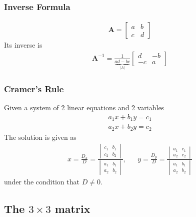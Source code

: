 \documentclass[10pt,a4paper]{book}
\theoremstyle{definition}\newtheorem{definition}{Definition}
\theoremstyle{definition}\newtheorem{fact}{Fact}
\theoremstyle{definition}\newtheorem{ex}{Ex.}
\theoremstyle{definition}\newtheorem{project}{Project}
\theoremstyle{definition}\newtheorem{problem}{Problem}
\theoremstyle{definition}\newtheorem{example}{Example}
\numberwithin{theorem}{chapter}
\numberwithin{corollary}{chapter}
\numberwithin{assumption}{chapter}
\numberwithin{definition}{chapter}
\numberwithin{prop}{chapter}
\numberwithin{notation}{chapter}
\numberwithin{problem}{chapter}
\numberwithin{example}{chapter}
\numberwithin{fact}{chapter}
\numberwithin{ex}{chapter}
\def\A{\mathbf A}
\begin{document}
	\subsubsection{Inverse Formula}
	\begin{align*}
		\A = \begin{bmatrix}
			a & b \\ c & d
		\end{bmatrix}
	\end{align*}
	Its inverse is
	\begin{align*}
		\A^{-1} = \frac{1}
		{\underbrace{ad-bc}_{|A|}} \begin{bmatrix}
			d & -b \\ -c & a
		\end{bmatrix}
	\end{align*}
	\subsubsection{Cramer's Rule}
	Given a system of 2 linear equations and 2 variables
	\begin{align*}
		a_1 x + b_1 y = c_1 \\
		a_2 x + b_2 y = c_2
	\end{align*}
	The solution is given as
	\begin{align*}
		x = \frac{D_x}{D} = \frac{
			\begin{vmatrix}
				c_1 & b_1 \\ c_2 & b_2
		\end{vmatrix}}{
		\begin{vmatrix}
			a_1 & b_1 \\ a_2 & b_2
		\end{vmatrix}
	}, &&
	y = \frac{D_y}{D} = \frac{
		\begin{vmatrix}
			a_1 & c_1 \\ a_2 & c_2
	\end{vmatrix}}{
		\begin{vmatrix}
			a_1 & b_1 \\ a_2 & b_2
		\end{vmatrix}
	}
	\end{align*}
	under the condition that $D \neq 0$.
	
	\subsection{The $3\times 3$ matrix}
\end{document}
